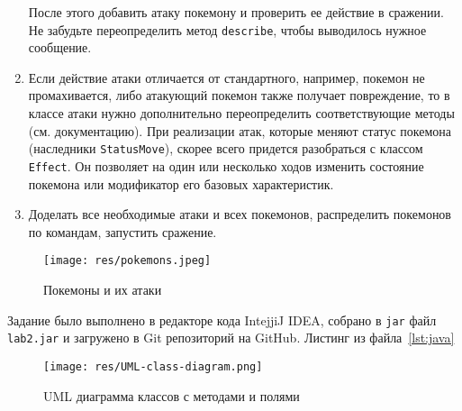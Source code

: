 \begin{enumerate}
        После этого добавить атаку покемону и проверить ее действие в сражении.
        Не забудьте переопределить метод \verb|describe|, чтобы выводилось нужное сообщение.
        \item Если действие атаки отличается от стандартного, например, покемон не промахивается, либо атакующий покемон также получает повреждение, то в классе атаки нужно дополнительно переопределить соответствующие методы (см.
        документацию).
        При реализации атак, которые меняют статус покемона (наследники \verb|StatusMove|), скорее всего придется разобраться с классом \verb|Effect|.
        Он позволяет на один или несколько ходов изменить состояние покемона или модификатор его базовых характеристик.
        \item Доделать все необходимые атаки и всех покемонов, распределить покемонов по командам, запустить сражение.
    \end{enumerate}
    \begin{figure}[H] %
        \centering
        \texttt{[image: res/pokemons.jpeg]}
        \caption{Покемоны и их атаки}
        \label{fig:enter-label}
    \end{figure}


    \newpage
    Задание было выполнено в редакторе кода IntejjiJ IDEA, собрано в \verb|jar| файл \verb|lab2.jar| и загружено в Git репозиторий на GitHub.
    Листинг из файла~\ref{lst:java}
    



    \begin{figure}[H] %
        \centering
        \texttt{[image: res/UML-class-diagram.png]}
        \caption{UML диаграмма классов с методами и полями}
        \label{fig:enter-label2}
    \end{figure}



